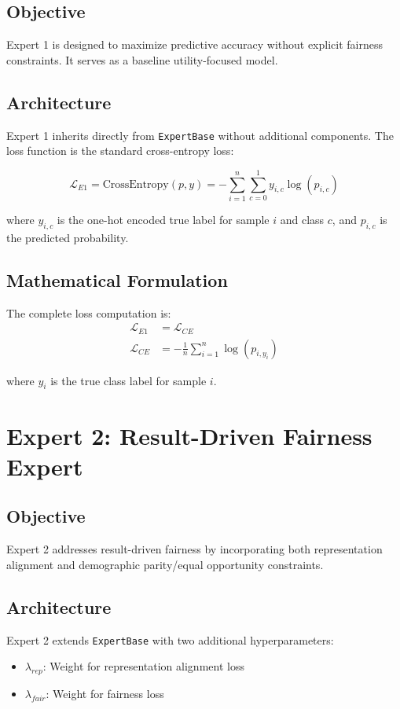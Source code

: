 \documentclass[11pt]{article}
\begin{document}
\subsection{Objective}
Expert 1 is designed to maximize predictive accuracy without explicit fairness constraints. It serves as a baseline utility-focused model.

\subsection{Architecture}
Expert 1 inherits directly from \texttt{ExpertBase} without additional components. The loss function is the standard cross-entropy loss:

\begin{equation}
    \mathcal{L}_{E1} = \text{CrossEntropy}(p, y) = -\sum_{i=1}^{n} \sum_{c=0}^{1} y_{i,c} \log(p_{i,c})
\end{equation}

where $y_{i,c}$ is the one-hot encoded true label for sample $i$ and class $c$, and $p_{i,c}$ is the predicted probability.

\subsection{Mathematical Formulation}
The complete loss computation is:
\begin{align}
    \mathcal{L}_{E1} &= \mathcal{L}_{CE} \\
    \mathcal{L}_{CE} &= -\frac{1}{n} \sum_{i=1}^{n} \log(p_{i,y_i})
\end{align}

where $y_i$ is the true class label for sample $i$.

\section{Expert 2: Result-Driven Fairness Expert}

\subsection{Objective}
Expert 2 addresses result-driven fairness by incorporating both representation alignment and demographic parity/equal opportunity constraints.

\subsection{Architecture}
Expert 2 extends \texttt{ExpertBase} with two additional hyperparameters:
\begin{itemize}
    \item $\lambda_{rep}$: Weight for representation alignment loss
    \item $\lambda_{fair}$: Weight for fairness loss
\end{itemize}
\end{document}
